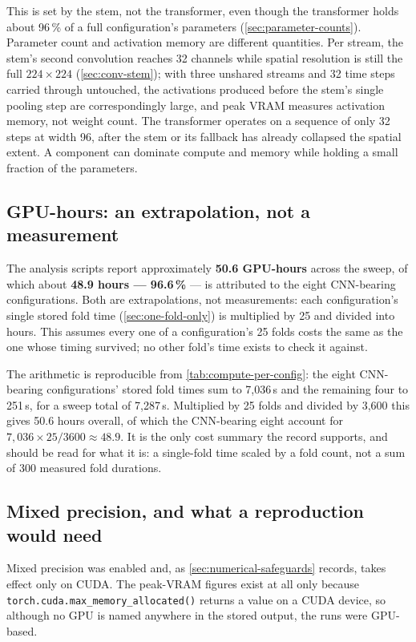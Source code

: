 This is set by the stem, not the transformer, even though the transformer holds about 96\,\% of a full configuration's parameters (\autoref{sec:parameter-counts}). Parameter count and activation memory are different quantities. Per stream, the stem's second convolution reaches 32 channels while spatial resolution is still the full $224 \times 224$ (\autoref{sec:conv-stem}); with three unshared streams and 32 time steps carried through untouched, the activations produced before the stem's single pooling step are correspondingly large, and peak VRAM measures activation memory, not weight count. The transformer operates on a sequence of only 32 steps at width 96, after the stem or its fallback has already collapsed the spatial extent. A component can dominate compute and memory while holding a small fraction of the parameters.

\subsection{GPU-hours: an extrapolation, not a measurement}
\label{sec:gpu-hours}

The analysis scripts report approximately \textbf{50.6 GPU-hours} across the sweep, of which about \textbf{48.9 hours --- 96.6\,\%} --- is attributed to the eight CNN-bearing configurations. Both are extrapolations, not measurements: each configuration's single stored fold time (\autoref{sec:one-fold-only}) is multiplied by 25 and divided into hours. This assumes every one of a configuration's 25 folds costs the same as the one whose timing survived; no other fold's time exists to check it against.

The arithmetic is reproducible from \autoref{tab:compute-per-config}: the eight CNN-bearing configurations' stored fold times sum to 7,036\,s and the remaining four to 251\,s, for a sweep total of 7,287\,s. Multiplied by 25 folds and divided by 3,600 this gives 50.6 hours overall, of which the CNN-bearing eight account for $7{,}036 \times 25 / 3600 \approx 48.9$. It is the only cost summary the record supports, and should be read for what it is: a single-fold time scaled by a fold count, not a sum of 300 measured fold durations.

\subsection{Mixed precision, and what a reproduction would need}
\label{sec:mixed-precision}

Mixed precision was enabled and, as \autoref{sec:numerical-safeguards} records, takes effect only on CUDA. The peak-VRAM figures exist at all only because \verb|torch.cuda.max_memory_allocated()| returns a value on a CUDA device, so although no GPU is named anywhere in the stored output, the runs were GPU-based.

